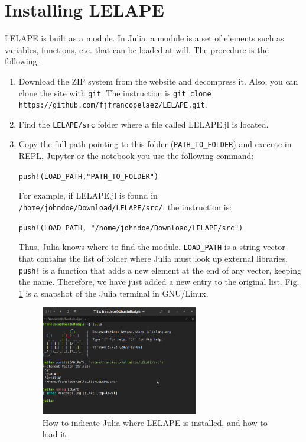 \section{Installing LELAPE}
LELAPE is built as a module. In Julia, a module is a set of elements such as variables, functions, etc. that can be loaded at will. The procedure is the following:
%
\begin{enumerate}
	\item Download the ZIP system from the website and decompress it. Also, you can clone the site with \texttt{git}. The instruction is \texttt{git clone https://github.com/fjfrancopelaez/LELAPE.git}.
	\item Find the \texttt{LELAPE/src} folder where a file called LELAPE.jl is located.
	\item Copy the full path pointing to this folder (\texttt{PATH\_TO\_FOLDER}) and execute in REPL, Jupyter or the notebook you use the following command:
	
	\vspace{1mm}
	\begin{center}
		\texttt{{push!(LOAD\_PATH,"PATH\_TO\_FOLDER")}}
	\end{center}
	\vspace{1mm}	
	
	For example, if LELAPE.jl is found in \texttt{/home/johndoe/Download/LELAPE/src/}, the instruction is:
		
	\vspace{1mm}
	\begin{center}
		\texttt{push!(LOAD\_PATH, "/home/johndoe/Download/LELAPE/src")}
	\end{center}
	\vspace{1mm}	
	
	Thus, Julia knows where to find the module. \texttt{LOAD\_PATH} is a string vector that contains the list of folder where Julia must look up external libraries. \texttt{push!} is a function that adds a new element at the end of any vector, keeping the name. Therefore, we have just added a new entry to the original list.	Fig. \ref{Fig:Loading_LELAPE} is a snapshot of the Julia terminal in GNU/Linux.
	\begin{figure}
		\centering
		
		\includegraphics[width=0.65\textwidth]{fig/Loading_LELAP.png}
		\caption{How to indicate Julia where LELAPE is installed, and how to load it.}
		\label{Fig:Loading_LELAPE}
	\end{figure}
	

\end{enumerate}
